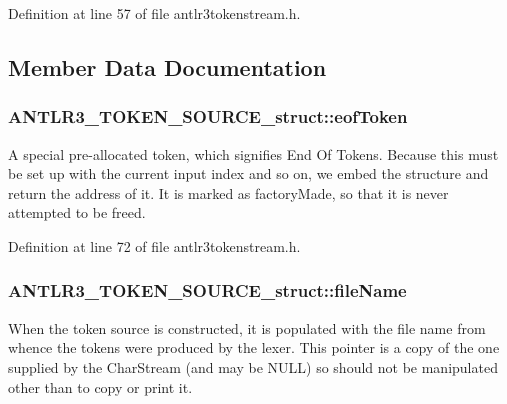 Definition at line 57 of file antlr3tokenstream.\-h.



\subsection{Member Data Documentation}
\hypertarget{struct_a_n_t_l_r3___t_o_k_e_n___s_o_u_r_c_e__struct_a40b1631371c9aa2872f411c691d7348e}{
\subsubsection[{eof\-Token}]{ A\-N\-T\-L\-R3\-\_\-\-T\-O\-K\-E\-N\-\_\-\-S\-O\-U\-R\-C\-E\-\_\-struct\-::eof\-Token}}\label{struct_a_n_t_l_r3___t_o_k_e_n___s_o_u_r_c_e__struct_a40b1631371c9aa2872f411c691d7348e}
A special pre-\/allocated token, which signifies End Of Tokens. Because this must be set up with the current input index and so on, we embed the structure and return the address of it. It is marked as factory\-Made, so that it is never attempted to be freed. 

Definition at line 72 of file antlr3tokenstream.\-h.

\hypertarget{struct_a_n_t_l_r3___t_o_k_e_n___s_o_u_r_c_e__struct_ac71607f39f82e74a177e44bcada52343}{
\subsubsection[{file\-Name}]{ A\-N\-T\-L\-R3\-\_\-\-T\-O\-K\-E\-N\-\_\-\-S\-O\-U\-R\-C\-E\-\_\-struct\-::file\-Name}}\label{struct_a_n_t_l_r3___t_o_k_e_n___s_o_u_r_c_e__struct_ac71607f39f82e74a177e44bcada52343}
When the token source is constructed, it is populated with the file name from whence the tokens were produced by the lexer. This pointer is a copy of the one supplied by the Char\-Stream (and may be N\-U\-L\-L) so should not be manipulated other than to copy or print it. 

